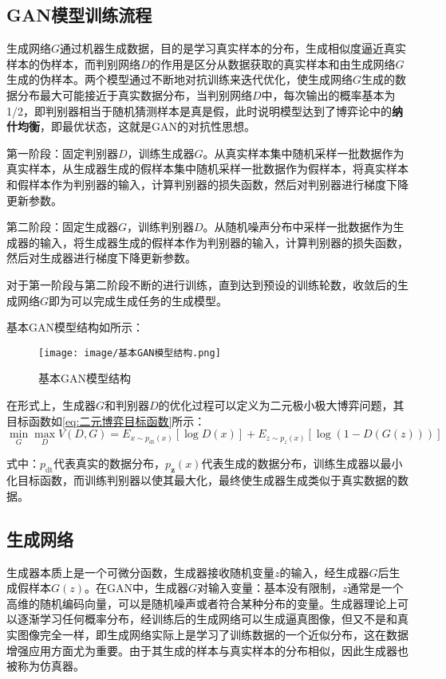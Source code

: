 \documentclass[lang=cn,a4paper,12pt,bibend=biber]{GAN}
\begin{document}
\subsection{GAN模型训练流程}

生成网络$G$通过机器生成数据，目的是学习真实样本的分布，生成相似度逼近真实样本的伪样本，而判别网络$D$的作用是区分从数据获取的真实样本和由生成网络$G$生成的伪样本。两个模型通过不断地对抗训练来迭代优化，使生成网络$G$生成的数据分布最大可能接近于真实数据分布，当判别网络$D$中，每次输出的概率基本为1/2，即判别器相当于随机猜测样本是真是假，此时说明模型达到了博弈论中的\textbf{纳什均衡}，即最优状态，这就是GAN的对抗性思想。

第一阶段：固定判别器$D$，训练生成器$G$。从真实样本集中随机采样一批数据作为真实样本，从生成器生成的假样本集中随机采样一批数据作为假样本，将真实样本和假样本作为判别器的输入，计算判别器的损失函数，然后对判别器进行梯度下降更新参数。

第二阶段：固定生成器$G$，训练判别器$D$。从随机噪声分布中采样一批数据作为生成器的输入，将生成器生成的假样本作为判别器的输入，计算判别器的损失函数，然后对生成器进行梯度下降更新参数。

对于第一阶段与第二阶段不断的进行训练，直到达到预设的训练轮数，收敛后的生成网络$G$即为可以完成生成任务的生成模型。

基本GAN模型结构如所示：
\begin{figure}[!htbp]
  \centering
  \texttt{[image: image/基本GAN模型结构.png]}
  \caption[]{基本GAN模型结构}
  \label{fig:基本GAN模型结构}
\end{figure}

在形式上，生成器$G$和判别器$D$的优化过程可以定义为二元极小极大博弈问题，其目标函数如\eqref{eq:二元博弈目标函数}所示：
\begin{equation}
  \min _{G} \max _{D} V(D, G) = E_{x \sim p_{\mathrm{dt}}(x)}[\log D(x)]+E_{z \sim p_{z}(x)}[\log (1-D(G(z)))]
  \label{eq:二元博弈目标函数}
\end{equation}

式中：$p_{\mathrm{dt}}$代表真实的数据分布，$p_{\boldsymbol{z}}(x)$代表生成的数据分布，训练生成器以最小化目标函数，而训练判别器以使其最大化，最终使生成器生成类似于真实数据的数据。



\subsection{生成网络}

生成器本质上是一个可微分函数，生成器接收随机变量$z$的输入，经生成器$G$后生成假样本$G(z)$。在GAN中，生成器$G$对输入变量：基本没有限制，$z$通常是一个高维的随机编码向量，可以是随机噪声或者符合某种分布的变量。生成器理论上可以逐渐学习任何概率分布，经训练后的生成网络可以生成逼真图像，但又不是和真实图像完全一样，即生成网络实际上是学习了训练数据的一个近似分布，这在数据增强应用方面尤为重要。由于其生成的样本与真实样本的分布相似，因此生成器也被称为仿真器。
\end{document}
